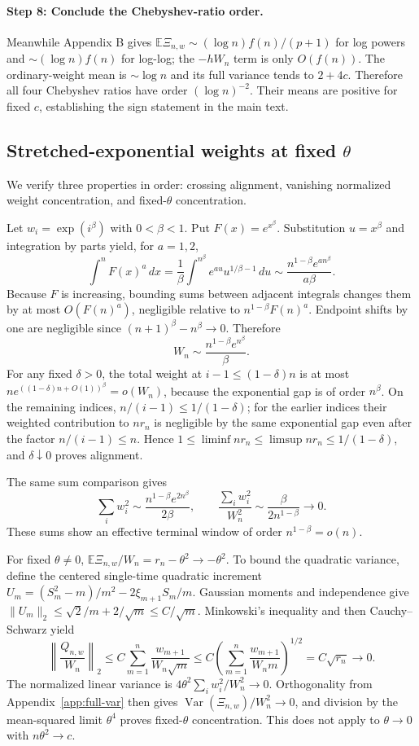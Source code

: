 \documentclass[11pt]{article}
\theoremstyle{definition}
\begin{document}
\paragraph{Step 8: Conclude the Chebyshev-ratio order.}
Meanwhile Appendix B gives $\mathbb E\Xi_{n,w}\sim(\log n)f(n)/(p+1)$ for log powers and $\sim(\log n)f(n)$ for log-log; the $-hW_n$ term is only $O(f(n))$. The ordinary-weight mean is $\sim\log n$ and its full variance tends to $2+4c$. Therefore all four Chebyshev ratios have order $(\log n)^{-2}$. Their means are positive for fixed $c$, establishing the sign statement in the main text.

\subsection{Stretched-exponential weights at fixed $\theta$}\label{app:stretched}
We verify three properties in order: crossing alignment, vanishing normalized weight concentration, and fixed-$\theta$ concentration.

Let $w_i=\exp(i^\beta)$ with $0<\beta<1$. Put $F(x)=e^{x^\beta}$. Substitution $u=x^\beta$ and integration by parts yield, for $a=1,2$,
\[
\int^n F(x)^a\,dx
=\frac1\beta\int^{n^\beta} e^{au}u^{1/\beta-1}\,du
\sim\frac{n^{1-\beta}e^{an^\beta}}{a\beta}.
\]
Because $F$ is increasing, bounding sums between adjacent integrals changes them by at most $O(F(n)^a)$, negligible relative to $n^{1-\beta}F(n)^a$. Endpoint shifts by one are negligible since $(n+1)^\beta-n^\beta\to0$. Therefore
\[
W_n\sim\frac{n^{1-\beta}e^{n^\beta}}{\beta}.
\]
For any fixed $\delta>0$, the total weight at $i-1\le(1-\delta)n$ is at most $n e^{((1-\delta)n+O(1))^\beta}=o(W_n)$, because the exponential gap is of order $n^\beta$. On the remaining indices, $n/(i-1)\le1/(1-\delta)$; for the earlier indices their weighted contribution to $nr_n$ is negligible by the same exponential gap even after the factor $n/(i-1)\le n$. Hence $1\le\liminf nr_n\le\limsup nr_n\le1/(1-\delta)$, and $\delta\downarrow0$ proves alignment.

The same sum comparison gives
\[
\sum_iw_i^2\sim\frac{n^{1-\beta}e^{2n^\beta}}{2\beta},\qquad
\frac{\sum_iw_i^2}{W_n^2}
\sim\frac{\beta}{2n^{1-\beta}}\to0.
\]
These sums show an effective terminal window of order $n^{1-\beta}=o(n)$.

For fixed $\theta\ne0$, $\mathbb E\Xi_{n,w}/W_n=r_n-\theta^2\to-\theta^2$. To bound the quadratic variance, define the centered single-time quadratic increment $U_m=(S_m^2-m)/m^2-2\xi_{m+1}S_m/m$. Gaussian moments and independence give
$\|U_m\|_2\le\sqrt2/m+2/\sqrt m\le C/\sqrt m$.
Minkowski's inequality and then Cauchy--Schwarz yield
\[
\left\|\frac{Q_{n,w}}{W_n}\right\|_2
\le C\sum_{m=1}^n\frac{w_{m+1}}{W_n\sqrt m}
\le C\left(\sum_{m=1}^n\frac{w_{m+1}}{W_nm}\right)^{1/2}
=C\sqrt{r_n}\to0.
\]
The normalized linear variance is $4\theta^2\sum_iw_i^2/W_n^2\to0$. Orthogonality from Appendix~\ref{app:full-var} then gives $\operatorname{Var}(\Xi_{n,w})/W_n^2\to0$, and division by the mean-squared limit $\theta^4$ proves fixed-$\theta$ concentration. This does not apply to $\theta\to0$ with $n\theta^2\to c$.
\end{document}

